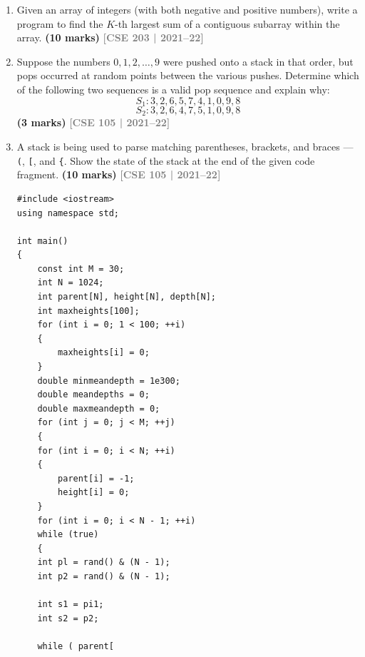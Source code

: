 \documentclass[12pt,a3paper]{article}
\newcommand{\yr}[1]{\hfill\textcolor{gray}{\small\textbf{[#1]}}}
\newcommand{\mk}[1]{\textcolor{orange!70!black}{\small\textbf{(#1 marks)}}}
\begin{document}
\begin{enumerate}
\item Given an array of integers (with both negative and positive numbers), write a program to find the $K$-th largest sum of a contiguous subarray within the array. \mk{10}
\yr{CSE 203 | 2021--22}

\item Suppose the numbers $0, 1, 2, \ldots, 9$ were pushed onto a stack in that order, but pops occurred at random points between the various pushes. Determine which of the following two sequences is a valid pop sequence and explain why:
\[S_1: 3,2,6,5,7,4,1,0,9,8\]
\[S_2: 3,2,6,4,7,5,1,0,9,8\]
\mk{3}
\yr{CSE 105 | 2021--22}

\item  A stack is being used to parse matching parentheses, brackets, and braces --- \texttt{(}, \texttt{[}, and \texttt{\{}. Show the state of the stack at the end of the given code fragment. \mk{10}
\yr{CSE 105 | 2021--22}

\begin{lstlisting}[style=cppstyle]
#include <iostream>
using namespace std;

int main()
{
    const int M = 30;
    int N = 1024;
    int parent[N], height[N], depth[N];
    int maxheights[100];
    for (int i = 0; 1 < 100; ++i)
    {
        maxheights[i] = 0;
    }
    double minmeandepth = 1e300;
    double meandepths = 0;
    double maxmeandepth = 0;
    for (int j = 0; j < M; ++j)
    {
    for (int i = 0; i < N; ++i)
    {
        parent[i] = -1;
        height[i] = 0;
    }
    for (int i = 0; i < N - 1; ++i)
    while (true)
    {
    int pl = rand() & (N - 1);
    int p2 = rand() & (N - 1);

    int s1 = pi1;
    int s2 = p2;

    while ( parent[
\end{lstlisting}


\end{enumerate}
\end{document}
